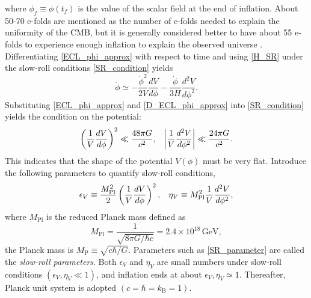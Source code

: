 \documentclass[12pt]{article}
\numberwithin{equation}{section}
\begin{document}
where $\phi_f \equiv \phi(t_f)$ is the value of the scalar field at the end of inflation. About 50-70 e-folds are mentioned as the number of e-folds needed to explain the uniformity of the CMB, but it is generally considered better to have about 55 e-folds to experience enough inflation to explain the observed universe \cite{Remmen:2014mia}. Differentiating \eqref{ECL_phi_approx} with respect to time and using \eqref{H_SR} under the slow-roll conditions \eqref{SR_condition} yields 
\begin{equation}\label{D_ECL_phi_approx}
    \ddot{\phi} \simeq -\frac{\dot{\phi}^2}{2V}\frac{dV}{d\phi} -\frac{\dot{\phi}}{3H}\frac{d^2 V}{d\phi^2}.
\end{equation}
Substituting \eqref{ECL_phi_approx} and \eqref{D_ECL_phi_approx} into \eqref{SR_condition} yields the condition on the potential:
\begin{equation}
    \left( \frac{1}{V}\frac{dV}{d\phi} \right)^2 \ll \frac{48\pi G}{c^2},\hspace{0.3cm} \left| \frac{1}{V}\frac{d^2 V}{d\phi^2} \right| \ll \frac{24\pi G}{c^2}.
\end{equation}
This indicates that the shape of the potential $V(\phi)$ must be very flat. Introduce the following parameters to quantify slow-roll conditions,
\begin{equation}\label{SR_parameter}
    \epsilon_{V} \equiv \frac{M_{\textrm{Pl}}^2}{2}\left( \frac{1}{V}\frac{dV}{d\phi} \right)^2, \hspace{0.3cm} \eta_{V} \equiv M_{\textrm{Pl}}^2\frac{1}{V}\frac{d^2V}{d\phi^2},
\end{equation}
where $M_{\textrm{Pl}}$ is the reduced Planck mass defined as
\begin{equation}\label{S Planck mass}
    M_{\textrm{Pl}} = \frac{1}{\sqrt{8\pi G / \hbar c}} = 2.4 \times 10^{18}\,\textrm{GeV},
\end{equation}
the Planck mass is $M_{\textrm{P}} \equiv \sqrt{c\hbar / G}$. Parameters such as \eqref{SR_parameter} are called the \textit{slow-roll parameters}. Both $\epsilon_{V}$ and $\eta_{V}$ are small numbers under slow-roll conditions $(\epsilon_{V}, \eta_{V} \ll 1)$, and inflation ends at about $\epsilon_{V}, \eta_{V} \simeq 1$. Thereafter, Planck unit system is adopted   $(c = \hbar = k_{\textrm{B}} = 1)$.
\end{document}
